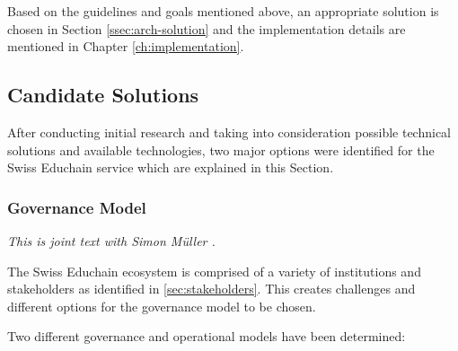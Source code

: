 Based on the guidelines and goals mentioned above, an appropriate solution is chosen in Section \ref{ssec:arch-solution} and the implementation details are mentioned in Chapter \ref{ch:implementation}.

\subsection{Candidate Solutions} \label{ssec:design-candidate-solutions}

After conducting initial research and taking into consideration possible technical solutions and available technologies, two major options were identified for the Swiss Educhain service which are explained in this Section.

\subsubsection{Governance Model} \label{ssec:design-governance-model}

\emph{This is joint text with Simon M{\"u}ller \cite{mueller20}.}

The Swiss Educhain ecosystem is comprised of a variety of institutions and stakeholders as identified in \ref{sec:stakeholders}. This creates challenges and different options for the governance model to be chosen.

Two different governance and operational models have been determined:

